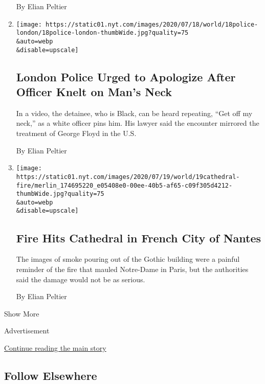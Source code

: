 \begin{enumerate}
  By Elian Peltier
\item
  \href{/2020/07/18/world/europe/london-police-knee.html}{}

  \texttt{[image: https://static01.nyt.com/images/2020/07/18/world/18police-london/18police-london-thumbWide.jpg?quality=75\\\&auto=webp\\\&disable=upscale]}

  \hypertarget{london-police-urged-to-apologize-after-officer-knelt-on-mans-neck}{%
  \subsection{London Police Urged to Apologize After Officer Knelt on
  Man's
  Neck}\label{london-police-urged-to-apologize-after-officer-knelt-on-mans-neck}}

  In a video, the detainee, who is Black, can be heard repeating, ``Get
  off my neck,'' as a white officer pins him. His lawyer said the
  encounter mirrored the treatment of George Floyd in the U.S.

  By Elian Peltier
\item
  \href{/2020/07/18/world/europe/fire-nantes-cathedral.html}{}

  \texttt{[image: https://static01.nyt.com/images/2020/07/19/world/19cathedral-fire/merlin\_174695220\_e05408e0-00ee-40b5-af65-c09f305d4212-thumbWide.jpg?quality=75\\\&auto=webp\\\&disable=upscale]}

  \hypertarget{fire-hits-cathedral-in-french-city-of-nantes}{%
  \subsection{Fire Hits Cathedral in French City of
  Nantes}\label{fire-hits-cathedral-in-french-city-of-nantes}}

  The images of smoke pouring out of the Gothic building were a painful
  reminder of the fire that mauled Notre-Dame in Paris, but the
  authorities said the damage would not be as serious.

  By Elian Peltier
\end{enumerate}

Show More

Advertisement

\protect\hyperlink{after-mid2}{Continue reading the main story}

\hypertarget{follow-elsewhere}{%
\subsection{Follow Elsewhere}\label{follow-elsewhere}}

